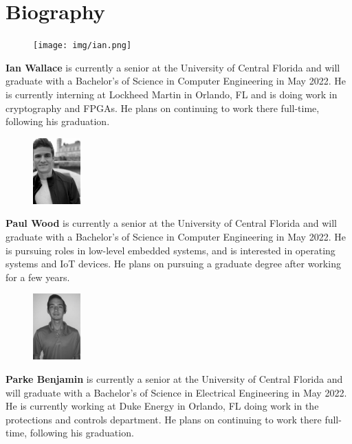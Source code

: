 \documentclass[conference]{IEEEtran}
\begin{document}
\section*{Biography}

\begin{figure}
\centering
\texttt{[image: img/ian.png]}
\end{figure}
\textbf{Ian Wallace} is currently a senior at the University of Central Florida and will graduate with a Bachelor's of Science in Computer Engineering in May 2022. He is currently interning at Lockheed Martin in Orlando, FL and is doing work in cryptography and FPGAs. He plans on continuing to work there full-time, following his graduation. \\ 



\begin{figure}
\centering
\includegraphics[height=1in]{img/paul.jpeg}
\end{figure}
\textbf{Paul Wood} is currently a senior at the University of Central Florida and will graduate with a Bachelor's of Science in Computer Engineering in May 2022. He is pursuing roles in low-level embedded systems, and is interested in operating systems and IoT devices. He plans on pursuing a graduate degree after working for a few years. \\

\begin{figure}
\centering
\includegraphics[height=1in]{img/Parke 2.jpeg}
\end{figure}
\textbf{Parke Benjamin} is currently a senior at the University of Central Florida and will graduate with a Bachelor's of Science in Electrical Engineering in May 2022. He is currently working at Duke Energy in Orlando, FL doing work in the protections and controls department. He plans on continuing to work there full-time, following his graduation. \\
\end{document}
